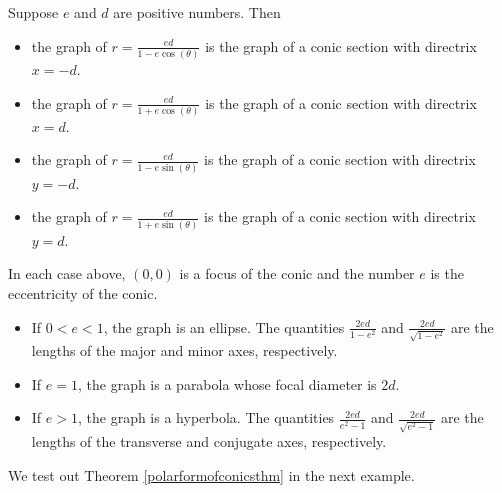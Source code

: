 \documentclass{ximera}
\begin{document}
\begin{theorem}  \label{polarformofconicsthm}  Suppose $e$ and $d$ are positive numbers.  Then

\begin{itemize}

\item  the graph of $r = \frac{ed}{1 - e\cos(\theta)}$ is the graph of a conic section with directrix $x = -d$.

\item  the graph of $r = \frac{ed}{1 + e\cos(\theta)}$ is the graph of a conic section with directrix $x = d$.

\item  the graph of $r = \frac{ed}{1 - e\sin(\theta)}$ is the graph of a conic section with directrix $y = -d$.

\item  the graph of $r = \frac{ed}{1 + e\sin(\theta)}$ is the graph of a conic section with directrix $y = d$.


\end{itemize}

In each case above, $(0,0)$ is a focus of the conic and the number $e$ is the eccentricity of the conic. 

\begin{itemize}

\item If $0 < e < 1$, the graph is an ellipse.   The quantities $\frac{2ed}{1-e^2}$ and  $\frac{2ed}{\sqrt{1-e^2}}$ are the lengths of the major and minor axes, respectively.

\item If $e = 1$, the graph is a parabola whose focal diameter is $2d$.

\item If $e > 1$, the graph is a hyperbola.  The quantities    $\frac{2ed}{e^2-1}$ and $\frac{2ed}{\sqrt{e^2-1}}$ are the lengths of the transverse and conjugate axes, respectively.

\end{itemize} 

 

\end{theorem}


 

We test out Theorem \ref{polarformofconicsthm} in the next example.

 
\end{document}
